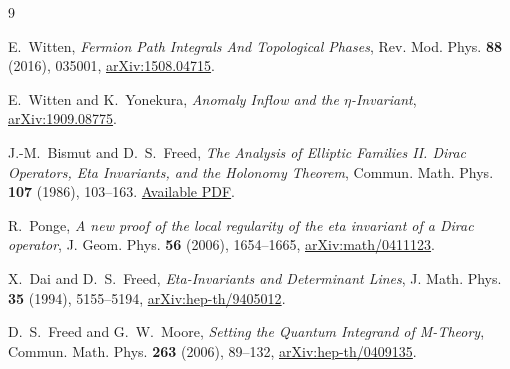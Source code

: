 \documentclass[11pt,a4paper]{article}
\theoremstyle{remark}
\numberwithin{equation}{section}
\begin{document}
\clearpage
\begin{thebibliography}{9}

E.~Witten,
\emph{Fermion Path Integrals And Topological Phases},
Rev. Mod. Phys. \textbf{88} (2016), 035001,
\href{https://arxiv.org/abs/1508.04715}{arXiv:1508.04715}.

E.~Witten and K.~Yonekura,
\emph{Anomaly Inflow and the $\eta$-Invariant},
\href{https://arxiv.org/abs/1909.08775}{arXiv:1909.08775}.

J.-M.~Bismut and D.~S.~Freed,
\emph{The Analysis of Elliptic Families II. Dirac Operators,
Eta Invariants, and the Holonomy Theorem},
Commun. Math. Phys. \textbf{107} (1986), 103--163.
\href{https://webhomes.maths.ed.ac.uk/~v1ranick/papers/bismfree2.pdf}{Available PDF}.

R.~Ponge,
\emph{A new proof of the local regularity of the eta invariant of
a Dirac operator},
J. Geom. Phys. \textbf{56} (2006), 1654--1665,
\href{https://arxiv.org/abs/math/0411123}{arXiv:math/0411123}.

X.~Dai and D.~S.~Freed,
\emph{Eta-Invariants and Determinant Lines},
J. Math. Phys. \textbf{35} (1994), 5155--5194,
\href{https://arxiv.org/abs/hep-th/9405012}{arXiv:hep-th/9405012}.

D.~S.~Freed and G.~W.~Moore,
\emph{Setting the Quantum Integrand of M-Theory},
Commun. Math. Phys. \textbf{263} (2006), 89--132,
\href{https://arxiv.org/abs/hep-th/0409135}{arXiv:hep-th/0409135}.

\end{thebibliography}
\end{document}
